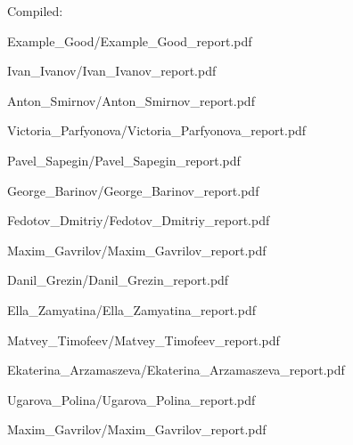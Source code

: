 \documentclass[a4paper]{article}
\begin{document}
Compiled: \DTMnow
\tableofcontents

\clearpage

{Example_Good/Example_Good_report.pdf}

{Ivan_Ivanov/Ivan_Ivanov_report.pdf}

{Anton_Smirnov/Anton_Smirnov_report.pdf}

{Victoria_Parfyonova/Victoria_Parfyonova_report.pdf}

{Pavel_Sapegin/Pavel_Sapegin_report.pdf}

{George_Barinov/George_Barinov_report.pdf}

{Fedotov_Dmitriy/Fedotov_Dmitriy_report.pdf}

{Maxim_Gavrilov/Maxim_Gavrilov_report.pdf}

{Danil_Grezin/Danil_Grezin_report.pdf}

{Ella_Zamyatina/Ella_Zamyatina_report.pdf}

{Matvey_Timofeev/Matvey_Timofeev_report.pdf}

{Ekaterina_Arzamaszeva/Ekaterina_Arzamaszeva_report.pdf}

{Ugarova_Polina/Ugarova_Polina_report.pdf}

{Maxim_Gavrilov/Maxim_Gavrilov_report.pdf}

\end{document}
